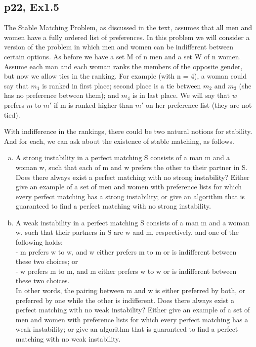 \documentclass[a4paper]{article}
\begin{document}
\subsection*{p22, Ex1.5}
\begin{adjustwidth}{1cm}{1cm}
	The Stable Matching Problem, as discussed in the text, assumes that all men and women have a fully ordered list of preferences. In this problem we will consider a version of the problem in which men and women can be indifferent between certain options. As before we have a set M of n men and a set W of n women. Assume each man and each woman ranks the members of the opposite gender, but now we allow ties in the ranking. For example (with n = 4), a woman could say that $m_1$ is ranked in first place; second place is a tie between $m_2$ and $m_3$ (she has no preference between them); and $m_4$ is in last place. We will say that $w$ prefers $m$ to $m'$ if m is ranked higher than $m'$ on her preference list (they are not tied).
	\par With indifference in the rankings, there could be two natural notions for stability. And for each, we can ask about the existence of stable matching, as follows.
	\begin{enumerate}[(a)]
		\item A strong instability in a perfect matching S consists of a man m and
		      a woman w, such that each of m and w prefers the other to their partner in S. Does there always exist a perfect matching with no strong instability? Either give an example of a set of men and women with preference lists for which every perfect matching has a strong instability; or give an algorithm that is guaranteed to find a perfect matching with no strong instability.
		\item A weak instability in a perfect matching S consists of a man m and
		      a woman w, such that their partners in S are w and m, respectively,
		      and one of the following holds: \\
		      \quad -  m prefers w to w, and w either prefers m to m or is indifferent
		      between these two choices; or \\
		      \quad -  w prefers m to m, and m either prefers w to w or is indifferent
		      between these two choices. \\
		      In other words, the pairing between m and w is either preferred
		      by both, or preferred by one while the other is indifferent. Does
		      there always exist a perfect matching with no weak instability? Either
		      give an example of a set of men and women with preference lists
		      for which every perfect matching has a weak instability; or give an
		      algorithm that is guaranteed to find a perfect matching with no weak
		      instability.
	\end{enumerate}
\end{adjustwidth}
\end{document}
